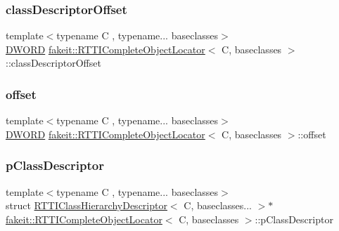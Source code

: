 \subsubsection{\texorpdfstring{classDescriptorOffset}{classDescriptorOffset}}
{\footnotesize\ttfamily template$<$typename C , typename... baseclasses$>$ \\
\mbox{\hyperlink{namespacefakeit_a3d9fcff73186d3a22472ec6156db1f10}{D\+W\+O\+RD}} \mbox{\hyperlink{structfakeit_1_1RTTICompleteObjectLocator}{fakeit\+::\+R\+T\+T\+I\+Complete\+Object\+Locator}}$<$ C, baseclasses $>$\+::class\+Descriptor\+Offset}

\mbox{\label{structfakeit_1_1RTTICompleteObjectLocator_a0b3ad4c837f642b303db427b81d5f8f8}} 
\subsubsection{\texorpdfstring{offset}{offset}}
{\footnotesize\ttfamily template$<$typename C , typename... baseclasses$>$ \\
\mbox{\hyperlink{namespacefakeit_a3d9fcff73186d3a22472ec6156db1f10}{D\+W\+O\+RD}} \mbox{\hyperlink{structfakeit_1_1RTTICompleteObjectLocator}{fakeit\+::\+R\+T\+T\+I\+Complete\+Object\+Locator}}$<$ C, baseclasses $>$\+::offset}

\mbox{\label{structfakeit_1_1RTTICompleteObjectLocator_a57ce7251a3aed05a28fb6f216cba979d}} 
\subsubsection{\texorpdfstring{pClassDescriptor}{pClassDescriptor}}
{\footnotesize\ttfamily template$<$typename C , typename... baseclasses$>$ \\
struct \mbox{\hyperlink{structfakeit_1_1RTTIClassHierarchyDescriptor}{R\+T\+T\+I\+Class\+Hierarchy\+Descriptor}}$<$ C, baseclasses... $>$$\ast$ \mbox{\hyperlink{structfakeit_1_1RTTICompleteObjectLocator}{fakeit\+::\+R\+T\+T\+I\+Complete\+Object\+Locator}}$<$ C, baseclasses $>$\+::p\+Class\+Descriptor}

